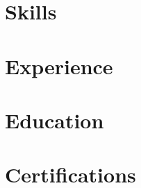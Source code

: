 \documentclass[a4paper,11pt]{article}
\begin{document}
  \vspace{0.5em}

\section{Skills}


\section{Experience}


\section{Education}




\section{Certifications}

\end{document}
